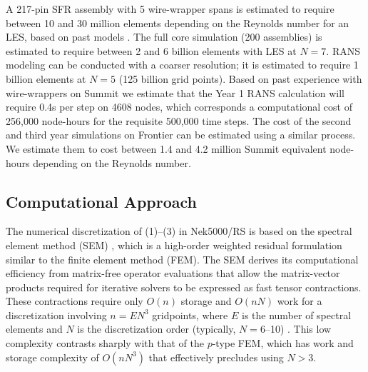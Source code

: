A 217-pin SFR assembly with 5 wire-wrapper spans is estimated to require
between 10 and 30 million elements depending on the Reynolds number for an LES,
based on past models \cite{merzari2020toward}. The full core simulation (200
assemblies) is estimated to require between 2 and 6 billion elements with
LES at $N=7$.  RANS modeling can be conducted with a coarser resolution;
it is estimated to require 1 billion elements at $N=5$ (125 billion grid
points).
%
Based on past experience with wire-wrappers on Summit we estimate that the Year
1 RANS calculation will require 0.4s per step on 4608 nodes, which corresponds
a computational cost of 256,000 node-hours for the requisite 500,000 time steps.
%
The cost of the second and third year simulations on Frontier can be estimated
using a similar process. We estimate them to cost between 1.4 and 4.2 million
Summit equivalent node-hours depending on the Reynolds number.

\vspace{-.25in}
\subsection{Computational Approach }
\vspace{-.2in}

The numerical discretization of (1)--(3) in Nek5000/RS is based on the spectral
element method (SEM) \cite{pat84}, which is a high-order weighted residual
formulation similar to the finite element method (FEM).  The SEM derives its
computational efficiency from matrix-free operator evaluations that allow the
matrix-vector products required for iterative solvers to be expressed as fast
tensor contractions.  These contractions require only $O(n)$ storage and
$O(nN)$ work for a discretization involving $n=EN^3$ gridpoints, where $E$ is
the number of spectral elements and $N$ is the discretization order (typically,
$N=$6--10) \cite{dfm02}.  This low complexity contrasts sharply with that of
the $p$-type FEM, which has work and storage complexity of $O(nN^3)$ that
effectively precludes using $N>3$.  

